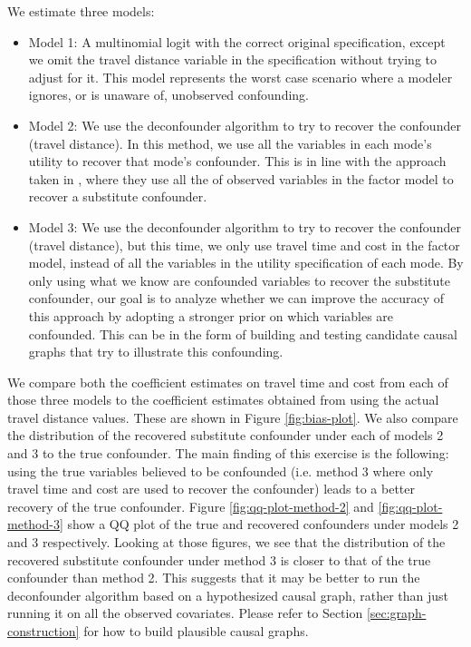 We estimate three models:

\begin{itemize}
	\item Model 1: A multinomial logit with the correct original specification,
	except we omit the travel distance variable in the specification without
	trying to adjust for it. This model represents the worst case scenario
	where a modeler ignores, or is unaware of, unobserved confounding.
	\item Model 2: We use the deconfounder algorithm to try to recover the
	confounder (travel distance). In this method, we use all the variables in
	each mode's utility to recover that mode's confounder. This is in line
	with the approach taken in \citet{wang_2019_blessings}, where they use all the
	of observed variables in the factor model to recover a substitute
	confounder.
	\item Model 3: We use the deconfounder algorithm to try to recover the
	confounder (travel distance), but this time, we only use travel time and
	cost in the factor model, instead of all the variables in the utility
	specification of each mode. By only using what we know are confounded
	variables to recover the substitute confounder, our goal is to analyze
	whether we can improve the accuracy of this approach by adopting a stronger
	prior on which variables are confounded. This can
	be in the form of building and testing candidate causal graphs that
	try to illustrate this confounding.
\end{itemize}


We compare both the coefficient estimates on travel time and cost from
each of those three models to the coefficient estimates obtained from using the actual travel distance values.
These are shown in Figure \ref{fig:bias-plot}.
We also compare the distribution of the recovered substitute confounder under each of
models 2 and 3 to the true confounder.
The main finding of this exercise is the following:
using the true variables believed to be confounded
(i.e. method 3 where only travel time and cost are used to recover the confounder)
leads to a better recovery of the true confounder.
Figure \ref{fig:qq-plot-method-2} and \ref{fig:qq-plot-method-3} show a QQ plot of the true
and recovered confounders under models 2 and 3 respectively. Looking at those
figures, we see that the distribution of the recovered substitute
confounder under method 3 is closer to that of the true confounder than method
2. This suggests that it may be better to run the deconfounder algorithm based
on a hypothesized causal graph, rather than just running it on all the
observed covariates. Please refer to Section \ref{sec:graph-construction} for how to build plausible causal graphs.



